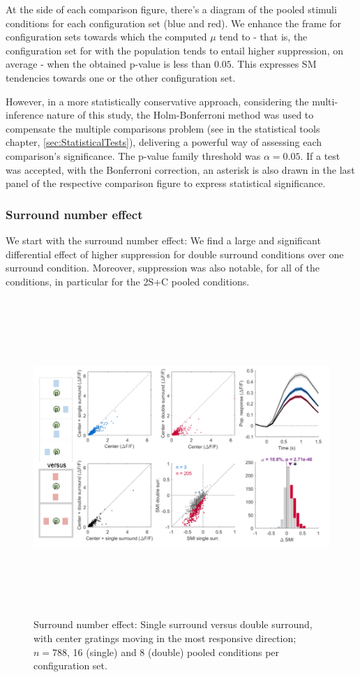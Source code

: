 At the side of each comparison figure, there's a diagram of the pooled stimuli conditions for each configuration set (blue and red). We enhance the frame for configuration sets towards which the computed $\mu$ tend to - that is, the configuration set for with the population tends to entail higher suppression, on average - when the obtained p-value is less than $0.05$. This expresses SM tendencies towards one or the other configuration set.

However, in a more statistically conservative approach, considering the multi-inference nature of this study, the Holm-Bonferroni method was used to compensate the multiple comparisons problem (see in the statistical tools chapter, \ref{sec:StatisticalTests}), delivering a powerful way of assessing each comparison's significance. The p-value family threshold was $\alpha=0.05$. If a test was accepted, with the Bonferroni correction, an asterisk is also drawn in the last panel of the respective comparison figure to express statistical significance.

\subsubsection{Surround number effect}

We start with the surround number effect: We find a large and significant differential effect of higher suppression for double surround conditions over one surround condition. Moreover, suppression was also notable, for all of the conditions, in particular for the 2S+C pooled conditions.

\begin{figure}[H] \centering \includegraphics[width=12cm,height=12cm,keepaspectratio]{Figures/7.Results/finalPopulation/sel/diagrams/1.png} 
\caption{Surround number effect: Single surround versus double surround, with center gratings moving in the most responsive direction; $n=788$, 16 (single) and 8 (double) pooled conditions per configuration set.} \label{1}
\end{figure}

